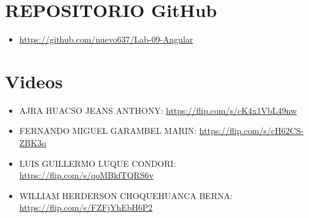 \documentclass{article}
\begin{document}
	\clearpage




	\section{REPOSITORIO GitHub}

	\begin{itemize}
		\item \url{https://github.com/nuevo637/Lab-09-Angular}
	\end{itemize}
	
	\section{Videos}
	\begin{itemize}
		\item AJRA HUACSO JEANS ANTHONY:  \url{https://flip.com/s/cK4x1VbL49nw}
		\item FERNANDO MIGUEL GARAMBEL MARIN:  \url{https://flip.com/s/cH62CS-ZBK3q}
		\item LUIS GUILLERMO LUQUE CONDORI: \url{https://flip.com/s/qoMBkfTQRS6v}
		\item WILLIAM HERDERSON CHOQUEHUANCA BERNA: \url{https://flip.com/s/FZFjYhEbH6P2}
	\end{itemize}
\end{document}
